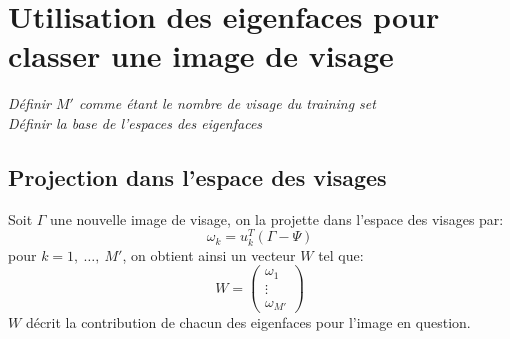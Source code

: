 \documentclass[12pt,french]{article}
\theoremstyle{plain}
\theoremstyle{definition}
\begin{document}
\section{Utilisation des eigenfaces pour classer une image de visage}
\emph{Définir $M'$ comme étant le nombre de visage du training set}\\
\emph{Définir la base de l'espaces des eigenfaces}

\subsection{Projection dans l'espace des visages}
Soit $\Gamma$ une nouvelle image de visage, on la projette dans l'espace des visages par:
$$\omega_k = u_k^T(\Gamma - \Psi)$$
pour $k = 1,~\dots,~M'$, on obtient ainsi un vecteur $W$ tel que:
\[W =
  \begin{pmatrix}
    \omega_1 \\
    \vdots \\
    \omega_{M'}
  \end{pmatrix}
\]
$W$ décrit la contribution de chacun des eigenfaces pour l'image en question.
\end{document}

